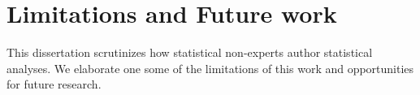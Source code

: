 \begin{comment}
\section{Recent developments} \label{sec:recentDevelopments}
Mention: in LLMs impact the contributions of this dissertation, exciting opportunities to leverage them to realize the goals of this work

\subsection{Construct validity: Within reach with the usage of LLMs}
This thesis focused on internal, external, and statistical conclusion validity. However, could reason about construct validity with LLMs.

\subsection{What about in the face of LLMs?}

But how do people express their domain knowledge, make the process meaningful

Mention LLMs as a technology to use here?
\end{comment}

\section{Limitations and Future work} \label{sec:futureWork}

This dissertation scrutinizes how statistical non-experts author statistical
analyses. We elaborate one some of the limitations of this work and
opportunities for future research. 

\begin{comment}
    Improving statistical analysis authoring opens up questions in
addressing core issues in statistics, end-user software engineering, programming
language design, which we hope will be additional directions other pursue. 

Some themes that emerge: 
- Support for after statistical modeling -- what do these mean? (interpretation) --> What to do next? / what would help me answer my research question? (modeling-testing) --> 
- How to capture and use these consequences into next phases of the lifecycle? 
- How could all these improve science and make data analysis more robust? 
\end{comment}

